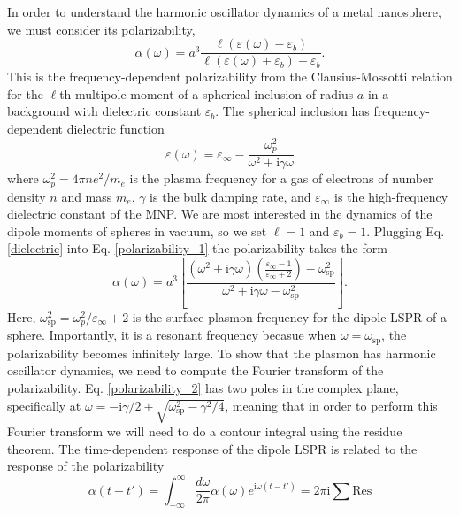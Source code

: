 \documentclass [11pt, proquest] {uwthesis}[2016/11/22]
\begin{document}
In order to understand the harmonic oscillator dynamics of a metal nanosphere\cite{KREIBIG1985,ARPC}, we must consider its polarizability,
\begin{equation}
\alpha(\omega) = a^3\frac{\ell(\varepsilon(\omega)-\varepsilon_b)}{\ell(\varepsilon(\omega)+\varepsilon_b)+\varepsilon_b}.
\label{polarizability_1}
\end{equation}
This is the frequency-dependent polarizability from the Clausius-Mossotti relation\cite{Clausius} for the $\ell$th multipole moment of a spherical inclusion of radius $a$ in a background with dielectric constant $\varepsilon_b$.  The spherical inclusion has frequency-dependent dielectric function 
\begin{equation}
\varepsilon(\omega) = \varepsilon_{\infty} - \frac{\omega_p^2}{\omega^2+\textrm{i}\gamma\omega}
\label{dielectric}
\end{equation}
where $\omega_p^2 = 4\pi ne^2/m_e$ is the plasma frequency for a gas of electrons of number density $n$ and mass $m_e$, $\gamma$ is the bulk damping rate, and $\varepsilon_{\infty}$ is the high-frequency dielectric constant of the MNP. We are most interested in the dynamics of the dipole moments of spheres in vacuum, so we set $\ell = 1$ and $\varepsilon_b = 1$. Plugging Eq. \ref{dielectric} into Eq. \ref{polarizability_1} the polarizability takes the form
\begin{equation}
\alpha(\omega) = a^3\left[\frac{\left(\omega^2+\textrm{i}\gamma\omega\right)\left(\frac{\varepsilon_{\infty}-1}{\varepsilon_{\infty}+2}\right)-\omega_{\textrm{sp}}^2}{\omega^2+\textrm{i}\gamma\omega-\omega_{\textrm{sp}}^2}\right].
\label{polarizability_2}
\end{equation}
Here, $\omega_{\textrm{sp}}^2 = \omega_p^2/\varepsilon_{\infty}+2$ is the surface plasmon frequency for the dipole LSPR of a sphere. Importantly, it is a resonant frequency becasue when $\omega=\omega_{\textrm{sp}}$, the polarizability becomes infinitely large. To show that the plasmon has harmonic oscillator dynamics, we need to compute the Fourier transform of the polarizability. Eq. \ref{polarizability_2} has two poles in the complex plane, specifically at $\omega = -\textrm{i}\gamma/2 \pm \sqrt{\omega_\textrm{sp}^2-\gamma^2/4}$, meaning that in order to perform this Fourier transform we will need to do a contour integral using the residue theorem. The time-dependent response of the dipole LSPR is related to the response of the polarizability\cite{ARPC,Quillin}
\begin{equation}
\alpha(t-t') = \int_{-\infty}^{\infty}\frac{d\omega}{2\pi}\alpha(\omega)e^{\textrm{i}\omega (t-t')} = 2\pi\textrm{i}\sum\textrm{Res}
\label{res_theorem}
\end{equation}
\end{document}
